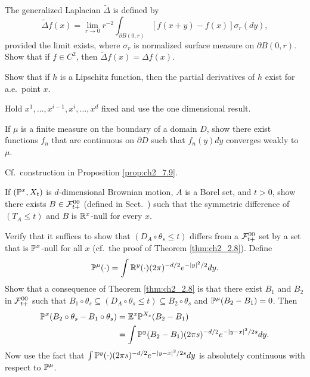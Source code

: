 \begin{exercise}\label{ex:ch2_7}
The generalized Laplacian $\widetilde{\Delta}$ is defined by
\[
    \widetilde{\Delta}f(x) = \lim_{r\to 0} r^{-2} \int_{\partial B(0,r)}[f(x + y) - f(x)]\sigma_r(dy),
\]
provided the limit exists, where $\sigma_r$ is normalized surface measure on $\partial B(0,r)$. Show that if $f \in C^2$, then $\widetilde{\Delta}f(x) = \Delta f(x)$.
\end{exercise}

\begin{exercise}\label{ex:ch2_8}
Show that if $h$ is a Lipschitz function, then the partial derivatives of $h$ exist for a.e.\ point $x$.

\hint  Hold $x^1,\ldots,x^{i-1},x^i,\ldots,x^d$ fixed and use the one dimensional result.
\end{exercise}

\begin{exercise}\label{ex:ch2_9}
If $\mu$ is a finite measure on the boundary of a domain $D$, show there exist functions $f_n$ that are continuous on $\partial D$ such that $f_n(y)dy$ converges weakly to $\mu$.

\hint Cf.\ construction in Proposition \ref{prop:ch2_7.9}.
\end{exercise}

\begin{exercise}\label{ex:ch2_10}
If $(\P^x, X_t)$ is $d$-dimensional Brownian motion, $A$ is a Borel set, and $t > 0$, show there exists $B \in \FC_{t+}^{00}$ (defined in Sect.\ ) such that the symmetric difference of $(T_A \leq t)$ and $B$ is $\R^x$-null for every $x$.

\hint Verify that it suffices to show that $(D_A \circ \theta_s \leq t)$ differs from a $\FC_{t+}^{00}$ set by a set that is $\P^x$-null for all $x$ (cf.\ the proof of Theorem \ref{thm:ch2_2.8}). Define
\[
    \P^\mu(\cdot) = \int \R^y(\cdot)(2\pi)^{-d/2}e^{-|y|^2/2}dy.
\]
Show that a consequence of Theorem \ref{thm:ch2_2.8} is that there exist $B_1$ and $B_2$ in $\FC_{t+}^{00}$ such that $B_1 \circ \theta_s \subseteq (D_A \circ \theta_s \leq t) \subseteq B_2 \circ \theta_s$ and $\P^\mu(B_2 - B_1) = 0$. Then
\begin{align*}
    \P^x(B_2 \circ \theta_s - B_1 \circ \theta_s) &= \E^x\P^{X_s}(B_2 - B_1) \\
    &= \int \P^y(B_2 - B_1)(2\pi s)^{-d/2}e^{-|y-x|^2/2s}dy.
\end{align*}
Now use the fact that $\int \P^y(\cdot)(2\pi s)^{-d/2}e^{-|y-x|^2/2s}dy$ is absolutely continuous with respect to $\P^\mu$.
\end{exercise}

